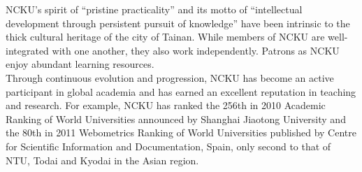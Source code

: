 NCKU's spirit of ``pristine practicality'' and its motto of ``intellectual development through persistent pursuit of knowledge'' have been intrinsic to the thick cultural heritage of the city of Tainan. While members of NCKU are well-integrated with one another, they also work independently. Patrons as NCKU enjoy abundant learning resources.\\

Through continuous evolution and progression, NCKU has become an active participant in global academia and has earned an excellent reputation in teaching and research. For example, NCKU has ranked the 256th in 2010 Academic Ranking of World Universities announced by Shanghai Jiaotong University and the 80th in 2011 Webometrics Ranking of World Universities published by Centre for Scientific Information and Documentation, Spain, only second to that of NTU, Todai and Kyodai in the Asian region.

